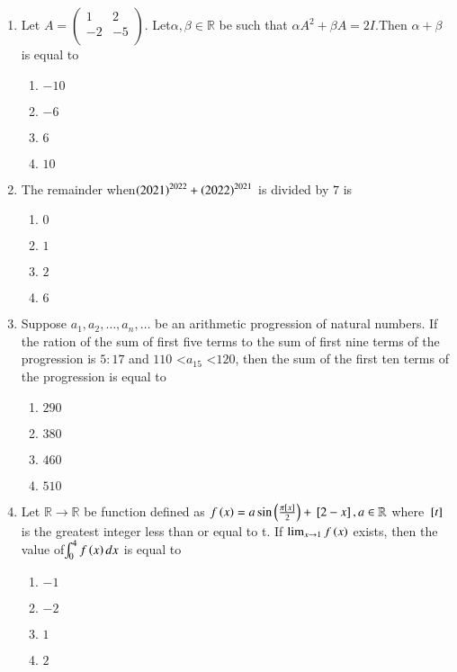 \documentclass[journal,12pt,twocolumn]{IEEEtran}
\theoremstyle{remark}
\begin{document}
\begin{enumerate}[start=1]
\item  Let $A = \begin{pmatrix}1 & 2 \\-2 & -5 \\\end{pmatrix}$. Let$\alpha, \beta \in \mathbb {R}$ be such that $
\alpha A^2 + \beta A = 2I$.Then $ \alpha + \beta $ is equal to
\hfill{}
		\begin{enumerate}
    \item $-10$
    \item $-6$
    \item $6$
    \item $10$
\end{enumerate}
\item The remainder when$\left(2021\right)^{2022}+\left(2022\right)^{2021}$ is divided by $7$ is
\hfill{}
	\begin{enumerate}
    \item $ 0$
    \item $1$
    \item $2$
    \item $6$
\end{enumerate}
\item Suppose $a_1, a_2, \dots, a_n, \dots$ be an arithmetic progression of natural numbers. If the ration of the sum of first five terms to the sum of first nine terms of the  progression is $5:17$ and $110$ \textless$ a_{15}$ \textless $120$, then the sum of the first ten terms of the progression is equal to
\hfill{}
	\begin{enumerate}
    \item $290$
    \item $380$
    \item $460$
    \item $510$
\end{enumerate}
\item Let $\mathbb {R} \rightarrow \mathbb {R}$ be function defined as
$f\left(x\right)=a\sin \left(\frac{\pi {}\left[x\right]}{2}\right) + {}\left[2-x\right], a\in \mathbb{R}$ where ${}\left[t\right]$ is the greatest integer less than or equal to t. If $ \lim_{ x \to 1}f\left(x\right)$ exists, then the value of$ \int_{0}^{4}f\left(x\right) dx $ is equal to
\hfill{}
		\begin{enumerate}
    \item $-1$
    \item $-2$
    \item $1$
    \item $2$
\end{enumerate}

\end{enumerate}
\end{document}
